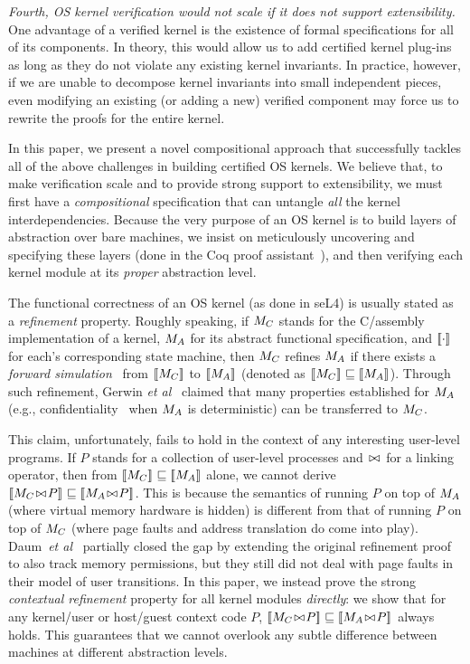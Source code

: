 {\em Fourth, OS kernel verification would not scale if it does not 
support extensibility.} One advantage of a verified
kernel is the existence of formal specifications for all of its
components. In theory, this would allow us to add certified
kernel plug-ins
~\cite{shao10:ctos} 
as long as they do not violate any existing kernel invariants. In
practice, however, if we are unable to decompose kernel invariants
into small independent pieces, even modifying an existing (or adding a
new) verified component may force us to rewrite the proofs for the
entire kernel.

In this paper, we present a novel compositional approach that
successfully tackles all of the above challenges in building certified
OS kernels. We believe that, to make verification scale and to provide
strong support to extensibility, we must first have a {\em
  compositional} specification that can untangle {\em all} the kernel
interdependencies. Because the very purpose of an OS kernel is to
build layers of abstraction over bare machines, we insist on
meticulously uncovering and specifying these layers (done in the Coq
proof assistant~\cite{coq}), and then verifying each kernel module at
its {\em proper} abstraction level.

The functional correctness of an OS kernel (as done in seL4) is
usually stated as a {\em refinement} property. Roughly speaking, if
$M_C$ stands for the C/assembly implementation of a kernel, $M_A$
for its abstract functional specification, and $[\![\cdot]\!]_{}$ for
each's corresponding state machine, then $M_C$ refines $M_A$ if
there exists a {\em forward simulation}~\cite{Lynch95} from
$[\![M_C]\!]_{}$ to $[\![M_A]\!]_{}$ (denoted as $[\![M_C]\!]_{} \sqsubseteq
[\![M_A]\!]_{}$).  Through such refinement, Gerwin {\em et
  al}~\cite{klein14,murray13,sewell11,sewell13} claimed that many
properties established for $M_A$ (e.g.,
confidentiality~\cite{murray13} when $M_A$ is deterministic) can be
transferred to $M_C$.

This claim, unfortunately, fails to hold in the context of any
interesting user-level programs. If $P$ stands for a collection of
user-level processes and $\;\!\bowtie\!\;$ for a linking operator, then from
$[\![M_C]\!]_{} \sqsubseteq [\![M_A]\!]_{}$ alone, we cannot derive
$\sem{}{\mimp\join{}P} \Refrel \sem{}{\mabs\join{}P}$. This is because
the semantics of running $P$ on top of $M_A$ (where virtual memory
hardware is hidden) is different from that of running $P$ on top of
$M_C$ (where page faults and address translation do come into play).
Daum~{\em et al}~\cite{daum14} partially closed the gap by extending
the original refinement proof to also track memory permissions, but
they still did not deal with page faults in their model of user
transitions.  In this paper, we instead prove the strong {\em
  contextual refinement} property for all kernel modules {\em
  directly}: we show that for any kernel/user or host/guest context
code $P$, $\sem{}{\mimp\join{}P} \Refrel \sem{}{\mabs\join{}P}$ always
holds. This guarantees that we cannot overlook any subtle difference
between machines at different abstraction levels.

